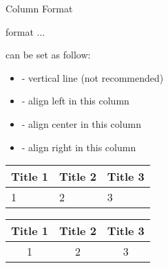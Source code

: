 \begin{frame}[fragile]{Column Format}

\begin{command}
\begin{LCL}
\begin{tabular}{format}
...
\end{tabular}
\end{LCL}
\end{command}

	 can be set as follow:
	\begin{itemize}
		\item \packagename{|} - vertical line (not recommended)
		\item {} - align left in this column
		\item {} - align center in this column
		\item {} - align right in this column
	\end{itemize}
	\begin{example}
		\begin{minipage}{0.48\linewidth}
			\centering
			 \medskip
			
        	\begin{tabular}{lll}
        		\toprule
        		Title 1 & Title 2 & Title 3 \\
        		\midrule
        		1 & 2 &3 \\
        		\bottomrule
        	\end{tabular}
		\end{minipage}
		\begin{minipage}{0.48\linewidth}
			\centering
			 \medskip
			
        	\begin{tabular}{c|cc}
        		\toprule
        		Title 1 & Title 2 & Title 3 \\
        		\midrule
        		1 & 2 &3 \\
        		\bottomrule
        	\end{tabular}
		\end{minipage}
    \end{example}	
\end{frame}

